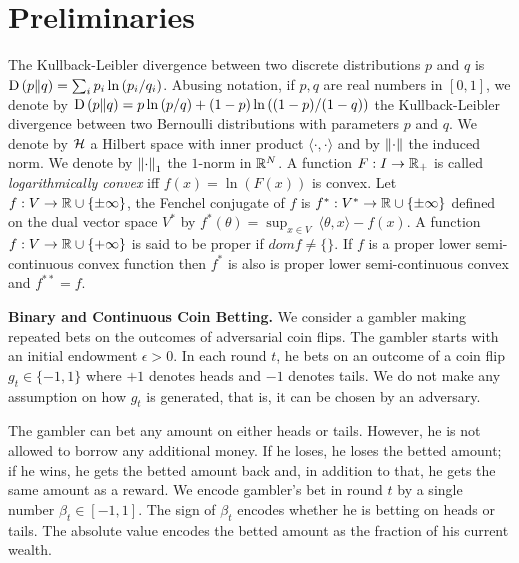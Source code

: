 \section{Preliminaries}
\label{sec:prel}

The Kullback-Leibler divergence between two discrete distributions $p$ and $q$
is $\operatorname*{D}\left({p}\middle\|{q}\right) = \sum_{i} p_i \ln\left( p_i/q_i \right)$. Abusing
notation, if $p,q$ are real numbers in $[0,1]$, we denote by $\operatorname*{D}\left({p}\middle\|{q}\right) = p \ln
\left(p/q \right) + (1-p) \ln \left((1-p)/(1-q) \right)$ the
Kullback-Leibler divergence between two Bernoulli distributions with parameters
$p$ and $q$.  We denote by $\mathcal{H}$ a Hilbert space with inner product $\langle
\cdot, \cdot\rangle$ and by $\left\|{\cdot}\right\|$ the induced norm.  We denote by
$\left\|{\cdot}\right\|_1$ the $1$-norm in $\mathbb{R}^N$.  A function $F:I \to \mathbb{R}_+$ is called
\emph{logarithmically convex} iff $f(x) = \ln(F(x))$ is convex.
Let $f:V \to \mathbb{R} \cup \{\pm\infty\}$, the Fenchel conjugate of $f$ is $f^*:V^* \to \mathbb{R} \cup \{\pm
\infty\}$ defined on the dual vector space $V^*$ by $f^*(\theta) = \sup_{x \in
V} \ \langle \theta, x \rangle - f(x)$.  A function $f:V \to \mathbb{R} \cup \{+
\infty\}$ is said to be proper if $dom f \neq \{\}$. If $f$ is a proper lower semi-continuous convex
function then $f^*$ is also is proper lower semi-continuous convex and
$f^{**}=f$.

\textbf{Binary and Continuous Coin Betting.} We consider a gambler making
repeated bets on the outcomes of adversarial coin flips. The gambler starts with an
initial endowment $\epsilon > 0$. In each round $t$, he bets on an outcome of a
coin flip $g_t \in \{-1,1\}$ where $+1$ denotes heads and $-1$ denotes tails.
We do not make any assumption on how $g_t$ is generated, that is, it can be
chosen by an adversary.

The gambler can bet any amount on either heads or tails. However, he is not
allowed to borrow any additional money. If he loses, he loses the betted amount; if he wins, he gets the betted amount back and, in addition to that, he
gets the same amount as a reward.  We encode gambler's bet in round $t$ by a
single number $\beta_t \in [-1,1]$. The sign of $\beta_t$ encodes whether he is
betting on heads or tails. The absolute value encodes the betted amount as the
fraction of his current wealth.

